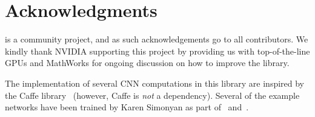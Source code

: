 \section{Acknowledgments}\label{s:ack}

\matconvnet is a community project, and as such acknowledgements go to all contributors. We kindly thank NVIDIA supporting this project by providing us with top-of-the-line GPUs and MathWorks for ongoing discussion on how to improve the library. 

The implementation of several CNN computations in this library are inspired by the Caffe library~\cite{jia13caffe} (however, Caffe is \emph{not} a dependency). Several of the example networks have been trained by Karen Simonyan as part of~\cite{chatfield14return} and~\cite{simonyan15very}.
